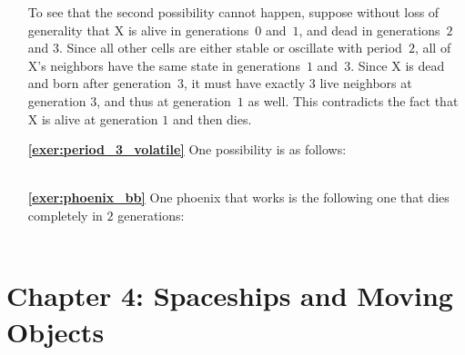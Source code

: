 \begin{multicols}{2}
\begin{itemize}[leftmargin=0em]
		To see that the second possibility cannot happen, suppose without loss of generality that X is alive in generations~$0$ and~$1$, and dead in generations~$2$ and $3$. Since all other cells are either stable or oscillate with period~$2$, all of X's neighbors have the same state in generations~$1$ and~$3$. Since X is dead and born after generation~$3$, it must have exactly $3$ live neighbors at generation $3$, and thus at generation~$1$ as well. This contradicts the fact that X is alive at generation $1$ and then dies.\\
		
		
		\item[\bf\color{ocre}\sffamily\ref{exer:period_3_volatile}] One possibility is as follows: \\[-0.6em]
		
		 \\
		
		
		\item[\bf\color{ocre}\sffamily\ref{exer:phoenix_bb}] One phoenix that works is the following one that dies completely in $2$ generations: \\[-0.6em]
		
		 \\
	\end{itemize}
\end{multicols}


\hypertarget{solutions_spaceships}{}\label{solutions_spaceships}
\section*{Chapter 4: Spaceships and Moving Objects}
\renewcommand{\chapterfolder}{spaceships/}

